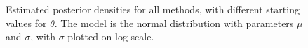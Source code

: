 \begin{figure}
    \caption{Estimated posterior densities for all methods, with different starting values for $\theta$. The model is the normal distribution with parameters $\mu$ and $\sigma$, with $\sigma$ plotted on log-scale.}%
    \label{fig:density_10k_04_06_normal}%
\end{figure}




